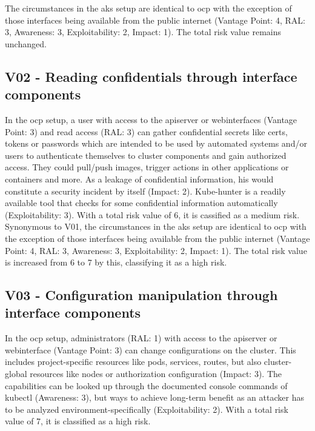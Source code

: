 The circumstances in the \gls{aks} setup are identical to \gls{ocp} with the exception of those interfaces being available from the public internet (Vantage Point: 4, RAL: 3, Awareness: 3, Exploitability: 2, Impact: 1). The total risk value remains unchanged.

\subsection{V02 - Reading confidentials through interface components}

In the \gls{ocp} setup, a user with access to the apiserver or webinterfaces (Vantage Point: 3) and read access (RAL: 3) can gather confidential secrets like certs, tokens or passwords which are intended to be used by automated systems and/or users to authenticate themselves to cluster components and gain authorized access. They could pull/push images, trigger actions in other applications or containers and more. As a leakage of confidential information, his would constitute a security incident by itself (Impact: 2). 
Kube-hunter is a readily available tool that checks for some confidential information automatically (Exploitability: 3).
With a total risk value of 6, it is cassified as a medium risk. \\


Synonymous to V01, the circumstances in the \gls{aks} setup are identical to \gls{ocp} with the exception of those interfaces being available from the public internet (Vantage Point: 4, RAL: 3, Awareness: 3, Exploitability: 2, Impact: 1). 
The total risk value is increased from 6 to 7 by this, classifying it as a high risk.

\subsection{V03 - Configuration manipulation through interface components}
In the \gls{ocp} setup, administrators (RAL: 1) with access to the apiserver or webinterface (Vantage Point: 3) can change configurations on the cluster. This includes project-specific resources like pods, services, routes, but also cluster-global resources like nodes or authorization configuration (Impact: 3).
The capabilities can be looked up through the documented console commands of kubectl (Awareness: 3), but ways to achieve long-term benefit as an attacker has to be analyzed environment-specifically (Exploitability: 2).
With a total risk value of 7, it is classified as a high risk. \\


